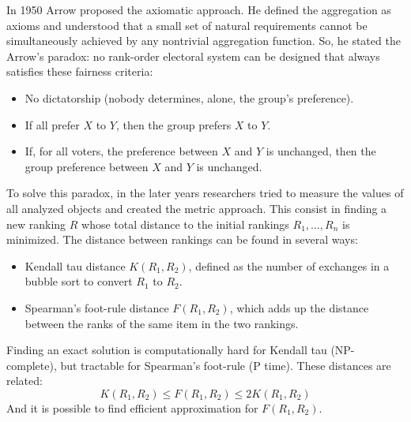 \documentclass[12pt, a4paper]{report}
\begin{document}
    In 1950 Arrow proposed the axiomatic approach. He defined the aggregation as axioms and understood that a small set of natural requirements cannot be simultaneously achieved by 
    any nontrivial aggregation function. So, he stated the Arrow's paradox: no rank-order electoral system can be designed that always satisfies these fairness criteria:
    \begin{itemize}
        \item No dictatorship (nobody determines, alone, the group's preference). 
        \item If all prefer $X$ to $Y$, then the group prefers $X$ to $Y$. 
        \item If, for all voters, the preference between $X$ and $Y$ is unchanged, then the group preference between $X$ and $Y$ is unchanged. 
    \end{itemize}

    To solve this paradox, in the later years researchers tried to measure the values of all analyzed objects and created the metric approach. This consist in finding a new ranking 
    $R$ whose total distance to the initial rankings $R_1,\dots,R_n$ is minimized. The distance between rankings can be found in several ways: 
    \begin{itemize}
        \item Kendall tau distance $K(R_1, R_2)$, defined as the number of exchanges in a bubble sort to convert $R_1$ to $R_2$. 
        \item Spearman's foot-rule distance $F(R_1, R_2)$, which adds up the distance between the ranks of the same item in the two rankings. 
    \end{itemize}
    Finding an exact solution is computationally hard for Kendall tau (NP-complete), but tractable for Spearman's foot-rule (P time). These distances are related:
    \[K(R_1, R_2) \leq F(R_1, R_2) \leq 2K(R_1, R_2)\]
    And it is possible to find efficient approximation for $F(R_1, R_2)$. 
\end{document}
